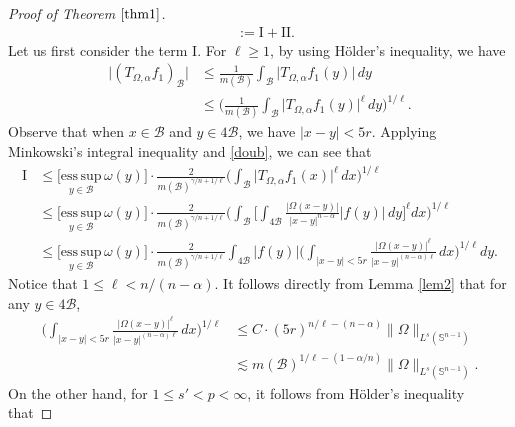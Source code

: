 \documentclass[preprint,10pt]{elsarticle}
\numberwithin{equation}{section}
\begin{document}
\begin{proof}[Proof of Theorem $\ref{thm1}$]
\begin{equation*}
\begin{split}
&:=\mathrm{I+II}.
\end{split}
\end{equation*}
Let us first consider the term $\mathrm{I}$. For $\ell\geq1$, by using H\"{o}lder's inequality, we have
\begin{equation}\label{doub}
\begin{split}
\big|(T_{\Omega,\alpha}f_1)_{\mathcal{B}}\big|
&\leq\frac{1}{m(\mathcal{B})}\int_{\mathcal{B}}\big|T_{\Omega,\alpha}f_1(y)\big|\,dy\\
&\leq\bigg(\frac{1}{m(\mathcal{B})}\int_{\mathcal{B}}\big|T_{\Omega,\alpha}f_1(y)\big|^{\ell}\,dy\bigg)^{1/{\ell}}.
\end{split}
\end{equation}
Observe that when $x\in \mathcal{B}$ and $y\in 4\mathcal{B}$, we have $|x-y|<5r$. Applying Minkowski's integral inequality and \eqref{doub}, we can see that
\begin{equation*}
\begin{split}
\mathrm{I}&\leq\Big[\underset{y\in \mathcal{B}}{\mathrm{ess\,sup}}\,\omega(y)\Big]\cdot
\frac{2}{m(\mathcal{B})^{\gamma/n+1/{\ell}}}\bigg(\int_{\mathcal{B}}\big|T_{\Omega,\alpha}f_1(x)\big|^{\ell}\,dx\bigg)^{1/{\ell}}\\
&\leq\Big[\underset{y\in \mathcal{B}}{\mathrm{ess\,sup}}\,\omega(y)\Big]\cdot
\frac{2}{m(\mathcal{B})^{\gamma/n+1/{\ell}}}
\bigg(\int_{\mathcal{B}}\bigg[\int_{4\mathcal{B}}\frac{|\Omega(x-y)|}{|x-y|^{n-\alpha}}|f(y)|\,dy\bigg]^{\ell}dx\bigg)^{1/{\ell}}\\
&\leq\Big[\underset{y\in \mathcal{B}}{\mathrm{ess\,sup}}\,\omega(y)\Big]\cdot
\frac{2}{m(\mathcal{B})^{\gamma/n+1/{\ell}}}
\int_{4\mathcal{B}}|f(y)|\bigg(\int_{|x-y|<5r}\frac{|\Omega(x-y)|^{\ell}}{|x-y|^{(n-\alpha)\ell}}\,dx\bigg)^{1/{\ell}}dy.
\end{split}
\end{equation*}
Notice that $1\leq\ell<n/{(n-\alpha)}$. It follows directly from Lemma \ref{lem2} that for any $y\in 4\mathcal{B}$,
\begin{equation}\label{cal2}
\begin{split}
\bigg(\int_{|x-y|<5r}\frac{|\Omega(x-y)|^{\ell}}{|x-y|^{(n-\alpha)\ell}}\,dx\bigg)^{1/{\ell}}
&\leq C\cdot(5r)^{n/{\ell}-(n-\alpha)}\|\Omega\|_{L^s(\mathbb{S}^{n-1})}\\
&\lesssim m(\mathcal{B})^{1/{\ell}-(1-\alpha/n)}\|\Omega\|_{L^s(\mathbb{S}^{n-1})}.
\end{split}
\end{equation}
On the other hand, for $1\leq s'<p<\infty$, it follows from H\"older's inequality that

\end{proof}
\end{document}
